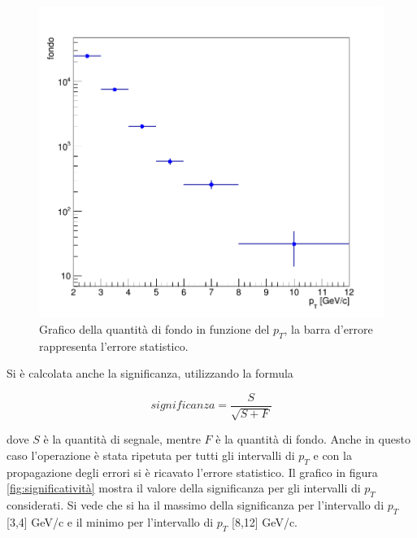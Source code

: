     \begin{figure}[h] 
        \centering
        \includegraphics[width=0.8\linewidth]{AnalisiDati/fondo.png}
        \caption{Grafico della quantità di fondo in funzione del $p_T$, la barra d'errore rappresenta l'errore statistico.}
        \label{fig:fondo}
    \end{figure}
 
\clearpage
Si è calcolata anche la significanza, utilizzando la formula 
 
 \begin{equation}
     significanza = \frac{S}{\sqrt{S+F}}
 \end{equation}

dove $S$ è la quantità di segnale, mentre $F$ è la quantità di fondo. Anche in questo caso l'operazione è stata ripetuta per tutti gli intervalli di $p_T$ e con la propagazione degli errori si è ricavato l'errore statistico. Il grafico in figura \ref{fig:significatività} mostra il valore della significanza per gli intervalli di $p_T$ considerati. Si vede che si ha il massimo della significanza per l'intervallo di $p_T$ [3,4] GeV/c e il minimo per l'intervallo di $p_T$ [8,12] GeV/c.

